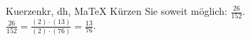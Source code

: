 \begin{MAufgabe}{Kuerzen}{kr, dh, MaTeX}
K\"urzen Sie soweit m\"oglich: $\frac{26}{152}$.\\ 
\ifLsg\MLoesung
\quad $\frac{26}{152}=\frac{(2)\cdot(13)}{(2)\cdot(76)}=\frac{13}{76}$.\else\relax\fi
 \end{MAufgabe}
